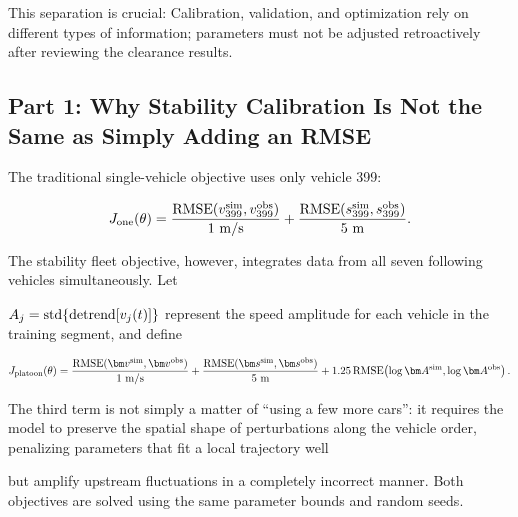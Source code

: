 \documentclass[11pt,a4paper,openany]{book}
\numberwithin{equation}{chapter}
\numberwithin{figure}{chapter}
\numberwithin{table}{chapter}
\begin{document}
This separation is crucial: Calibration, validation, and optimization rely on different types of information; parameters must not be adjusted retroactively after reviewing the clearance results.





\subsection{Part 1: Why Stability Calibration Is Not the Same as Simply Adding an RMSE}










The traditional single-vehicle objective uses only vehicle 399:

\begin{equation}
J_{\rm one}(\theta)
=\frac{{\rm RMSE}(v_{399}^{\rm sim},v_{399}^{\rm obs})}{1\ {\rm m/s}}
+\frac{{\rm RMSE}(s_{399}^{\rm sim},s_{399}^{\rm obs})}{5\ {\rm m}}.
\label{eq:ngsim-single-objective}
\end{equation}

The stability fleet objective, however, integrates data from all seven following vehicles simultaneously. Let

$A_j={\rm std}\{\operatorname{detrend}[v_j(t)]\}$ represent the speed amplitude for each vehicle in the training segment, and define

\begin{equation}
J_{\rm platoon}(\theta)
=\frac{{\rm RMSE}(\bm v^{\rm sim},\bm v^{\rm obs})}{1\ {\rm m/s}}
+\frac{{\rm RMSE}(\bm s^{\rm sim},\bm s^{\rm obs})}{5\ {\rm m}}
+1.25\,{\rm RMSE}\!\left(\log\bm A^{\rm sim},\log\bm A^{\rm obs}\right).
\label{eq:ngsim-platoon-objective}
\end{equation}

The third term is not simply a matter of “using a few more cars”: it requires the model to preserve the spatial shape of perturbations along the vehicle order, penalizing parameters that fit a local trajectory well

but amplify upstream fluctuations in a completely incorrect manner. Both objectives are solved using the same parameter bounds and random seeds.
\end{document}
